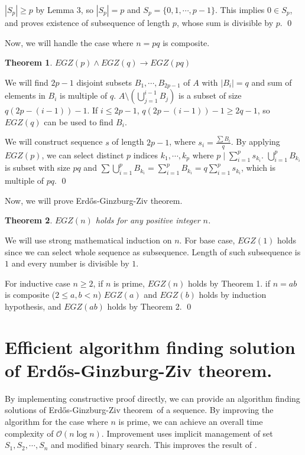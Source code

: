 \documentclass[11pt]{article}
\newtheorem{theorem}{Theorem}
\newcommand{\EGZT}{Erd\H{o}s-Ginzburg-Ziv theorem}
\begin{document}
$|S_p| \ge p$ by Lemma 3, so $|S_p| = p$ and $S_p = \{0, 1, \cdots, p-1\}$. This implies $0 \in S_p$, and proves existence of subsequence of length $p$, whose sum is divisible by $p$. \qed

\vspace{\baselineskip}


Now, we will handle the case where $n=pq$ is composite.

\begin{theorem}
$EGZ(p) \wedge EGZ(q) \rightarrow EGZ(pq)$
\end{theorem}

We will find $2p-1$ disjoint subsets $B_1, \cdots, B_{2p-1}$ of $A$ with $|B_i| = q$ and sum of elements in $B_i$ is multiple of $q$. $A \setminus (\bigcup_{j=1}^{i-1} B_{j})$ is a subset of size $q(2p-(i-1))-1$. If $i \le 2p-1$, $q(2p-(i-1))-1 \ge 2q-1$, so $EGZ(q)$ can be used to find $B_i$.

We will construct sequence $s$ of length $2p-1$, where $s_i = \frac{\sum B_i}{q}$. By applying $EGZ(p)$, we can select distinct $p$ indices $k_1, \cdots, k_p$ where $p \mid \sum_{i=1}^{p} s_{k_i}$. $\bigcup_{i=1}^{p} B_{k_i}$ is subset with size $pq$ and $\sum \bigcup_{i=1}^{p} B_{k_i} = \sum_{i=1}^{p} B_{k_i} = q \sum_{i=1}^{p} s_{k_i}$, which is multiple of $pq$. \qed

\vspace{\baselineskip}

Now, we will prove \EGZT .

\begin{theorem}
$EGZ(n)$ holds for any positive integer $n$.
\end{theorem}

We will use strong mathematical induction on $n$. For base case, $EGZ(1)$ holds since we can select whole sequence as subsequence. Length of such subsequence is $1$ and every number is divisible by $1$.

For inductive case $n \ge 2$, if $n$ is prime, $EGZ(n)$ holds by Theorem 1. if $n = ab$ is composite ($2 \le a, b < n$) $EGZ(a)$ and $EGZ(b)$ holds by induction hypothesis, and $EGZ(ab)$ holds by Theorem 2. \qed

\section{Efficient algorithm finding solution of \EGZT.}

By implementing constructive proof directly, we can provide an algorithm finding solutions of \EGZT\ of a sequence. By improving the algorithm for the case where $n$ is prime, we can achieve an overall time complexity of $\mathcal{O}(n \log n)$. Improvement uses implicit management of set $S_{1}, S_{2}, \cdots, S_{n}$ and modified binary search. This improves the result of \cite{2DELLUNGO20092658}.
\end{document}
